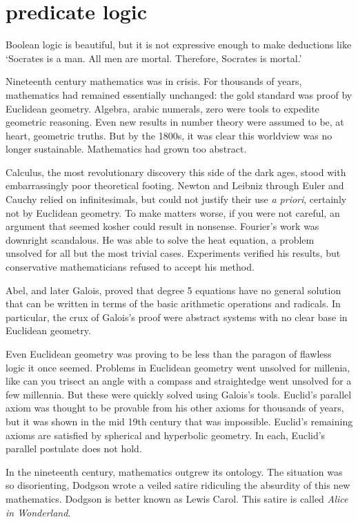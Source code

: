 \message{ !name(truth.tex)}\documentclass{scrbook}
\begin{document}
\chapter[Predicate Logic]{predicate logic}
Boolean logic is beautiful, but it is not expressive enough to make deductions like `Socrates is a man. All men are mortal. Therefore, Socrates is mortal.' 

Nineteenth century mathematics was in crisis. For thousands of years, mathematics had remained essentially unchanged: the gold standard was proof by Euclidean geometry. Algebra, arabic numerals, zero were tools to expedite geometric reasoning. Even new results in number theory were assumed to be, at heart, geometric truths. But by the 1800s, it was clear this worldview was no longer sustainable. Mathematics had grown too abstract.

Calculus, the most revolutionary discovery this side of the dark ages, stood with embarrassingly poor theoretical footing. Newton and Leibniz through Euler and Cauchy relied on infinitesimals, but could not justify their use \emph{a priori}, certainly not by Euclidean geometry. To make matters worse, if you were not careful, an argument that seemed kosher could result in nonsense. 
Fourier's work was downright scandalous. He was able to solve the heat equation, a problem unsolved for all but the most trivial cases. Experiments verified his results, but conservative mathematicians refused to accept his method.

Abel, and later Galois, proved that degree 5 equations have no general solution that can be written in terms of the basic arithmetic operations and radicals. In particular, the crux of Galois's proof were abstract systems with no clear base in Euclidean geometry. 

Even Euclidean geometry was proving to be less than the paragon of flawless logic it once seemed. Problems in Euclidean geometry went unsolved for millenia, like can you trisect an angle with a compass and straightedge went unsolved for a few millennia. But these were quickly solved using Galois's tools\cite{wiki:trisect}. Euclid's parallel axiom was thought to be provable from his other axioms for thousands of years, but it was shown in the mid 19th century that was impossible. Euclid's remaining axioms are satisfied by spherical and hyperbolic geometry. In each, Euclid's parallel postulate does not hold. 

In the nineteenth century, mathematics outgrew its ontology. The situation was so disorienting, Dodgson wrote a veiled satire ridiculing the absurdity of this new mathematics. Dodgson is better known as Lewis Carol. This satire is called \emph{Alice in Wonderland}.\cite{alice}
\end{document}
